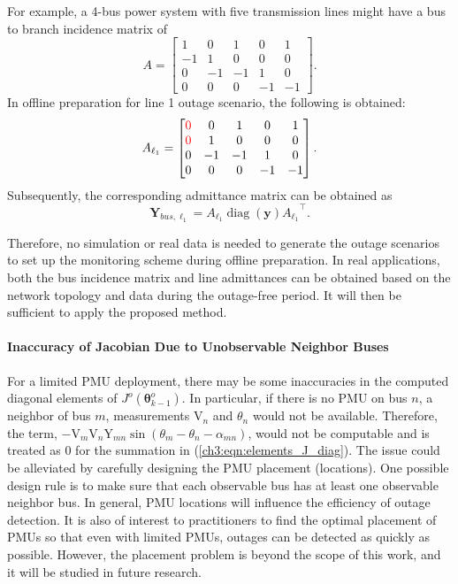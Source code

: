 For example, a 4-bus power system with five transmission lines might have a bus to branch incidence matrix of \[ {A} = \begin{bmatrix}
1   &   0   &   1   &   0   &   1 \\
-1  &   1   &   0   &   0   &   0 \\
0   &   -1  &   -1  &   1   &   0 \\
0   &   0   &   0   &   -1  &   -1
\end{bmatrix} .\]
In offline preparation for line 1 outage scenario, the following is obtained:
\[ {A}_{\ell_1} = \begin{bmatrix}
\color{red} 0   &   0   &   1   &   0   &   1 \\
\color{red} 0   &   1   &   0   &   0   &   0 \\
0   &   -1  &   -1  &   1   &   0 \\
0   &   0   &   0   &   -1  &   -1
\end{bmatrix} .\] Subsequently, the corresponding admittance matrix can be obtained as $$\boldsymbol{Y}_{bus, \ell_1} = {A_{\ell_1} \operatorname{diag}(\mathbf{y}) A_{\ell_1}}^{\top}.$$

Therefore, no simulation or real data is needed to generate the outage scenarios to set up the monitoring scheme during offline preparation. In real applications, both the bus incidence matrix and line admittances can be obtained based on the network topology and data during the outage-free period. It will then be sufficient to apply the proposed method.

\paragraph{Inaccuracy of Jacobian Due to Unobservable Neighbor Buses}
For a limited PMU deployment, there may be some inaccuracies in the computed diagonal elements of ${J}^o(\boldsymbol{\theta}^o_{k-1})$. In particular, if there is no PMU on bus $n$, a neighbor of bus $m$, measurements $\text{V}_{n}$ and $\theta_{n}$ would not be available. Therefore, the term, $-\text{V}_{m} \text{V}_{n} \text{Y}_{m n} \sin \left(\theta_{m}-\theta_{n}-\alpha_{m n}\right)$, would not be computable and is treated as 0 for the summation in (\ref{ch3:eqn:elements_J_diag}). The issue could be alleviated by carefully designing the PMU placement (locations). One possible design rule is to make sure that each observable bus has at least one observable neighbor bus. In general, PMU locations will influence the efficiency of outage detection. It is also of interest to practitioners to find the optimal placement of PMUs so that even with limited PMUs, outages can be detected as quickly as possible. However, the placement problem is beyond the scope of this work, and it will be studied in future research. 

